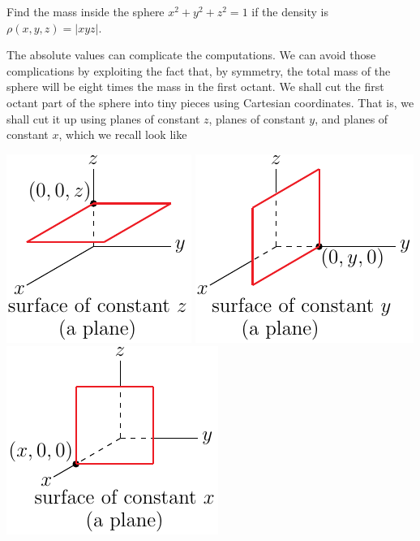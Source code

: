 \begin{eg}\label{eg sphere mass A}
Find the mass inside the sphere $x^2+y^2+z^2=1$ if the density
is $\rho(x,y,z) = |xyz|$.

\soln
The absolute values can complicate the computations. We can avoid
those complications by exploiting the fact that,
by symmetry, the total mass of the sphere will be eight times the mass
in the first octant.
We shall cut the first octant part of the sphere into tiny pieces using 
Cartesian coordinates. That is, we shall cut it up using planes of 
constant $z$, planes of constant $y$, and planes of constant $x$, 
which we recall look like
\begin{wfig}
\begin{center}
    \includegraphics{../figs_coord/cart2.pdf}\qquad
    \includegraphics{../figs_coord/cart4.pdf}\qquad
    \includegraphics{../figs_coord/cart3.pdf}

\end{center}
\end{wfig}
\end{eg}
